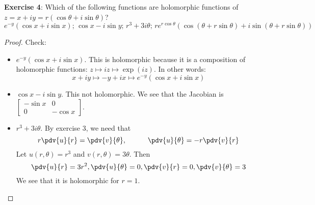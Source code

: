 \documentclass{article}
\begin{document}
\textbf{Exercise 4}: Which of the following functions are holomorphic functions of $z = x + iy = r(\cos{\theta} + i\sin{\theta})$?
\begin{equation*}
    e^{-y}(\cos{x} + i\sin{x}); \, \cos{x} - i\sin{y}; \, r^{3} + 3i\theta; \, re^{r\cos{\theta}}(\cos{(\theta + r\sin{\theta})} + i\sin{(\theta + r\sin{\theta})})
\end{equation*}
    \begin{proof}
        Check:
            \begin{itemize}
                \item $e^{-y}(\cos{x} + i\sin{x})$. This is holomorphic because it is a composition of holomorphic functions: $z \mapsto iz \mapsto \exp(iz)$. In other words:
                    \begin{equation*}
                        x + iy \mapsto -y + ix \mapsto e^{-y}(\cos{x} + i\sin{x})
                    \end{equation*}

                \item $\cos{x} - i\sin{y}$. This not holomorphic. We see that the Jacobian is $\begin{bmatrix}
                    -\sin{x} & 0        \\
                    0        & -\cos{x}   
                \end{bmatrix}$.

                \item $r^{3} + 3i\theta$. By exercise $3$, we need that
                    \begin{equation*}
                        r \pdv{u}{r} = \pdv{v}{\theta}, \hspace{30pt} \pdv{u}{\theta} = -r \pdv{v}{r}
                    \end{equation*}
                Let $u(r, \theta) = r^{3}$ and $v(r, \theta) = 3\theta$. Then
                    \begin{equation*}
                        \pdv{u}{r} = 3r^{2}, \pdv{u}{\theta} = 0, \pdv{v}{r} = 0, \pdv{v}{\theta} = 3
                    \end{equation*}
                We see that it is holomorphic for $r = 1$.


\end{itemize}
\end{proof}
\end{document}
